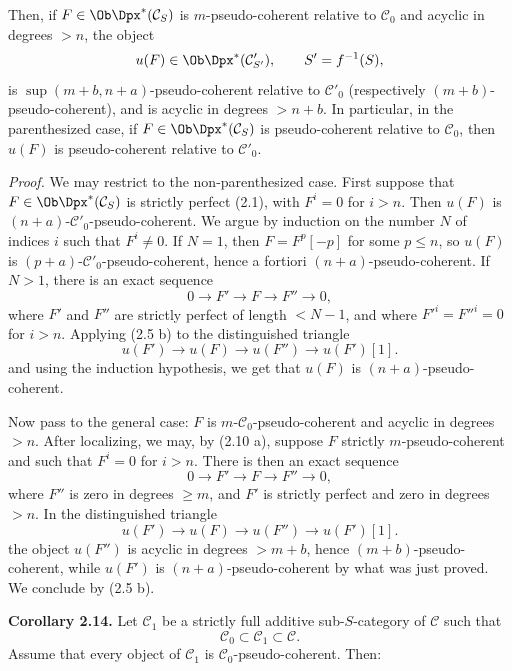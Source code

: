 Then, if \(F\in\Ob\Dpx^*(\mathcal C_S)\) is \(m\)-pseudo-coherent relative to \(\mathcal C_0\) and acyclic in degrees \(>n\), the object
\[
  u(F)\in\Ob\Dpx^*(\mathcal C'_{S'}),\qquad S'=f^{-1}(S),
\]
is \(\sup(m+b,n+a)\)-pseudo-coherent relative to \(\mathcal C'_0\) (respectively \((m+b)\)-pseudo-coherent), and is acyclic in degrees \(>n+b\). In particular, in the parenthesized case, if \(F\in\Ob\Dpx^*(\mathcal C_S)\) is pseudo-coherent relative to \(\mathcal C_0\), then \(u(F)\) is pseudo-coherent relative to \(\mathcal C'_0\).

\emph{Proof.} We may restrict to the non-parenthesized case. First suppose that \(F\in\Ob\Dpx^*(\mathcal C_S)\) is strictly perfect (2.1), with \(F^i=0\) for \(i>n\). Then \(u(F)\) is \((n+a)\)-\(\mathcal C'_0\)-pseudo-coherent. We argue by induction on the number \(N\) of indices \(i\) such that \(F^i\neq0\). If \(N=1\), then \(F=F^p[-p]\) for some \(p\leq n\), so \(u(F)\) is \((p+a)\)-\(\mathcal C'_0\)-pseudo-coherent, hence a fortiori \((n+a)\)-pseudo-coherent. If \(N>1\), there is an exact sequence
\[
  0\longrightarrow F'\longrightarrow F\longrightarrow F''\longrightarrow 0,
\]
where \(F'\) and \(F''\) are strictly perfect of length \(<N-1\), and where \(F'^i=F''^i=0\) for \(i>n\). Applying (2.5 b) to the distinguished triangle
\[
  u(F')\longrightarrow u(F)\longrightarrow u(F'')\longrightarrow u(F')[1].
\]
and using the induction hypothesis, we get that \(u(F)\) is \((n+a)\)-pseudo-coherent.

Now pass to the general case: \(F\) is \(m\)-\(\mathcal C_0\)-pseudo-coherent and acyclic in degrees \(>n\). After localizing, we may, by (2.10 a), suppose \(F\) strictly \(m\)-pseudo-coherent and such that \(F^i=0\) for \(i>n\). There is then an exact sequence
\[
  0\longrightarrow F'\longrightarrow F\longrightarrow F''\longrightarrow 0,
\]
where \(F''\) is zero in degrees \(\geq m\), and \(F'\) is strictly perfect and zero in degrees \(>n\). In the distinguished triangle
\[
  u(F')\longrightarrow u(F)\longrightarrow u(F'')\longrightarrow u(F')[1].
\]
the object \(u(F'')\) is acyclic in degrees \(>m+b\), hence \((m+b)\)-pseudo-coherent, while \(u(F')\) is \((n+a)\)-pseudo-coherent by what was just proved. We conclude by (2.5 b).

\textbf{Corollary 2.14.} Let \(\mathcal C_1\) be a strictly full additive sub-\(S\)-category of \(\mathcal C\) such that
\[
  \mathcal C_0\subset \mathcal C_1\subset \mathcal C.
\]
Assume that every object of \(\mathcal C_1\) is \(\mathcal C_0\)-pseudo-coherent. Then:

